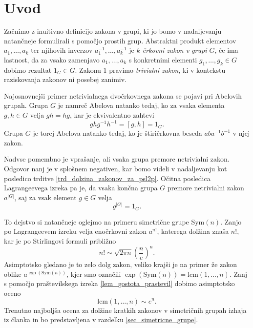 \section{Uvod}
Začnimo z inuitivno definicijo zakona v grupi, ki jo bomo v nadaljevanju natančneje formulirali s pomočjo prostih grup.
Abstraktni produkt elementov $a_1, \ldots , a_k$ ter njihovih inverzov $a_1^{-1}, \ldots , a_k^{-1}$ je \emph{$k$-črkovni zakon v grupi $G$}, če ima lastnost, da za vsako zamenjavo $a_1, \ldots, a_k$ s konkretnimi
elementi $g_1, \ldots, g_k \in G$ dobimo rezultat $1_G\in G$. Zakonu $1$ pravimo \emph{trivialni zakon}, ki v kontekstu raziskovanja zakonov ni posebej zanimiv.

Najosnovnejši primer netrivialnega dvočrkovnega zakona se pojavi pri Abelovih grupah. Grupa $G$ je namreč Abelova natanko tedaj, ko za vsaka elementa $g, h \in  G$ velja $gh = hg$, kar je ekvivalentno
zahtevi \begin{equation*}
ghg^{-1}h^{-1} = [g,h] = 1_G.
\end{equation*}
Grupa $G$ je torej Abelova natanko tedaj, ko je štiričrkovna beseda $aba^{-1}b^{-1}$ v njej zakon. 

Nadvse pomembno je vprašanje, ali vsaka grupa premore netrivialni zakon. Odgovor nanj je v splošnem negativen, kar bomo videli v nadaljevanju kot posledico trditve \ref{trd_dolzina_zakonov_za_psl2p}. 
Očitna posledica Lagrangeevega izreka pa je, da vsaka končna grupa $G$ premore
netrivialni zakon $a^{\lvert G \rvert }$, saj za vsak element $g \in G$ velja  
\begin{equation*}
g^{\lvert G \rvert } = 1_G.
\end{equation*}  

To dejstvo si natančneje oglejmo na primeru simetrične grupe $\text{Sym}(n)$. Zanjo po Lagrangeevem izreku velja enočrkovni zakon $a^{n !}$, katerega dolžina znaša $n!$, kar je po Stirlingovi formuli približno
\begin{equation*}
n! \sim \sqrt{2 \pi n} \left( \frac{n}{e} \right)^{n}.
\end{equation*}  
Asimptotsko gledano je to zelo dolg zakon, veliko krajši je na primer že zakon oblike $a^{\exp(\text{Sym}(n))}$, kjer smo označili $\exp(\text{Sym}(n)) = \text{lcm}(1, \ldots, n)$. Zanj s pomočjo praštevilskega izreka \ref{lem_gostota_prastevil} 
dobimo asimptotsko oceno \begin{equation*}
\text{lcm}(1, \ldots ,n) \sim e^{n}.
\end{equation*}  
Trenutno najboljša ocena za dolžine kratkih zakonov v simetričnih grupah izhaja iz članka \cite{Kozma_Thom_2016} in bo predstavljena v razdelku \ref{sec_simetricne_grupe}.

